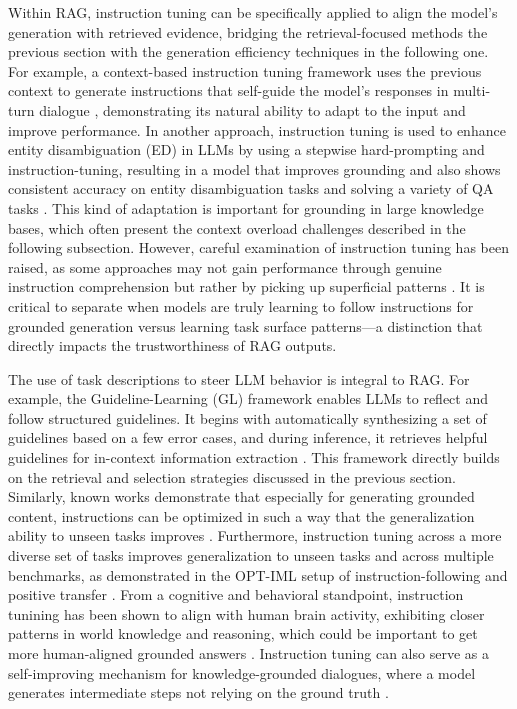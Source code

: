 \documentclass[11pt]{article}
\begin{document}
Within RAG, instruction tuning can be specifically applied to align the model's generation with retrieved evidence, bridging the retrieval-focused methods the previous section with the generation efficiency techniques in the following one. For example, a context-based instruction tuning framework uses the previous context to generate instructions that self-guide the model's responses in multi-turn dialogue \cite{ref149}, demonstrating its natural ability to adapt to the input and improve performance. In another approach, instruction tuning is used to enhance entity disambiguation (ED) in LLMs by using a stepwise hard-prompting and instruction-tuning, resulting in a model that improves grounding and also shows consistent accuracy on entity disambiguation tasks and solving a variety of QA tasks \cite{ref150}. This kind of adaptation is important for grounding in large knowledge bases, which often present the context overload challenges described in the following subsection. However, careful examination of instruction tuning has been raised, as some approaches may not gain performance through genuine instruction comprehension but rather by picking up superficial patterns \cite{ref151}. It is critical to separate when models are truly learning to follow instructions for grounded generation versus learning task surface patterns---a distinction that directly impacts the trustworthiness of RAG outputs.

The use of task descriptions to steer LLM behavior is integral to RAG. For example, the Guideline-Learning (GL) framework enables LLMs to reflect and follow structured guidelines. It begins with automatically synthesizing a set of guidelines based on a few error cases, and during inference, it retrieves helpful guidelines for in-context information extraction \cite{ref152}. This framework directly builds on the retrieval and selection strategies discussed in the previous section. Similarly, known works demonstrate that especially for generating grounded content, instructions can be optimized in such a way that the generalization ability to unseen tasks improves \cite{ref153}. Furthermore, instruction tuning across a more diverse set of tasks improves generalization to unseen tasks and across multiple benchmarks, as demonstrated in the OPT-IML setup of instruction-following and positive transfer \cite{ref154}. From a cognitive and behavioral standpoint, instruction tunining has been shown to align with human brain activity, exhibiting closer patterns in world knowledge and reasoning, which could be important to get more human-aligned grounded answers \cite{ref155}. Instruction tuning can also serve as a self-improving mechanism for knowledge-grounded dialogues, where a model generates intermediate steps not relying on the ground truth \cite{ref156}.
\end{document}
